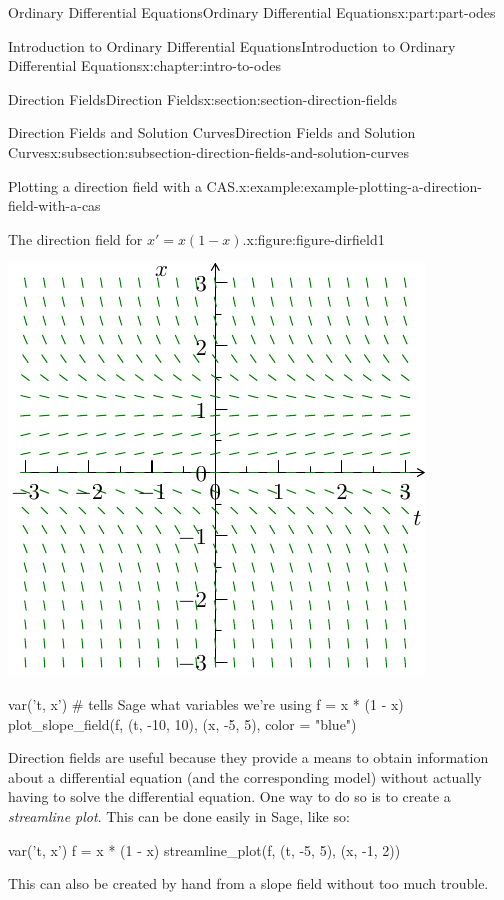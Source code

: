 \documentclass[oneside,10pt,]{book}
\numberwithin{equation}{part}
\begin{document}
\begin{partptx}{Ordinary Differential Equations}{}{Ordinary Differential Equations}{}{}{x:part:part-odes}
\begin{chapterptx}{Introduction to Ordinary Differential Equations}{}{Introduction to Ordinary Differential Equations}{}{}{x:chapter:intro-to-odes}
\begin{sectionptx}{Direction Fields}{}{Direction Fields}{}{}{x:section:section-direction-fields}
\begin{subsectionptx}{Direction Fields and Solution Curves}{}{Direction Fields and Solution Curves}{}{}{x:subsection:subsection-direction-fields-and-solution-curves}
\begin{example}{Plotting a direction field with a CAS.}{x:example:example-plotting-a-direction-field-with-a-cas}
\begin{figureptx}{The direction field for \(x' = x(1-x)\).}{x:figure:figure-dirfield1}{}%
\begin{image}{0.25}{0.5}{0.25}%
\includegraphics[width=\linewidth]{generated/asymptote/image-4.pdf}
\end{image}%
\tcblower
\end{figureptx}%
\end{example}
\begin{sageinput}
var('t, x')    # tells Sage what variables we're using
f = x * (1 - x)
plot_slope_field(f, (t, -10, 10), (x, -5, 5), color = "blue")
\end{sageinput}
Direction fields are useful because they provide a means to obtain information about a differential equation (and the corresponding model) without actually having to solve the differential equation. One way to do so is to create a \emph{streamline plot}. This can be done easily in Sage, like so: \begin{sageinput}
var('t, x')
f = x * (1 - x)
streamline_plot(f, (t, -5, 5), (x, -1, 2))
\end{sageinput}
 This can also be created by hand from a slope field without too much trouble.%
\par

\end{subsectionptx}
\end{sectionptx}
\end{chapterptx}
\end{partptx}
\end{document}
